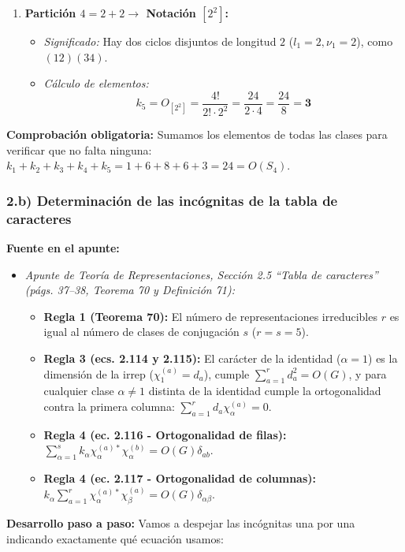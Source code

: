 \documentclass[11pt, a4paper]{article}
\begin{document}
\begin{enumerate}
    \item \textbf{Partición $4 = 2 + 2 \longrightarrow$ Notación $[2^2]$:}
    \begin{itemize}
        \item \textit{Significado:} Hay dos ciclos disjuntos de longitud $2$ ($l_1 = 2, \nu_1 = 2$), como $(12)(34)$.
        \item \textit{Cálculo de elementos:}
        \[
        k_5 = O_{[2^2]} = \frac{4!}{2! \cdot 2^2} = \frac{24}{2 \cdot 4} = \frac{24}{8} = \mathbf{3}
        \]
    \end{itemize}
\end{enumerate}
\textbf{Comprobación obligatoria:} Sumamos los elementos de todas las clases para verificar que no falta ninguna: $k_1 + k_2 + k_3 + k_4 + k_5 = 1 + 6 + 8 + 6 + 3 = 24 = O(S_4)$.

\subsubsection*{2.b) Determinación de las incógnitas de la tabla de caracteres}
\textbf{Fuente en el apunte:}
\begin{itemize}
    \item \textit{Apunte de Teoría de Representaciones, Sección 2.5 ``Tabla de caracteres'' (págs. 37--38, Teorema 70 y Definición 71):}
    \begin{itemize}
        \item \textbf{Regla 1 (Teorema 70):} El número de representaciones irreducibles $r$ es igual al número de clases de conjugación $s$ ($r = s = 5$).
        \item \textbf{Regla 3 (ecs. 2.114 y 2.115):} El carácter de la identidad ($\alpha = 1$) es la dimensión de la irrep ($\chi_1^{(a)} = d_a$), cumple $\sum_{a=1}^r d_a^2 = O(G)$, y para cualquier clase $\alpha \neq 1$ distinta de la identidad cumple la ortogonalidad contra la primera columna: $\sum_{a=1}^r d_a \chi_\alpha^{(a)} = 0$.
        \item \textbf{Regla 4 (ec. 2.116 - Ortogonalidad de filas):} $\sum_{\alpha=1}^s k_\alpha \chi_\alpha^{(a)*} \chi_\alpha^{(b)} = O(G) \delta_{ab}$.
        \item \textbf{Regla 4 (ec. 2.117 - Ortogonalidad de columnas):} $k_\alpha \sum_{a=1}^r \chi_\alpha^{(a)*} \chi_\beta^{(a)} = O(G) \delta_{\alpha\beta}$.
    \end{itemize}
\end{itemize}

\textbf{Desarrollo paso a paso:}
Vamos a despejar las incógnitas una por una indicando exactamente qué ecuación usamos:
\end{document}
